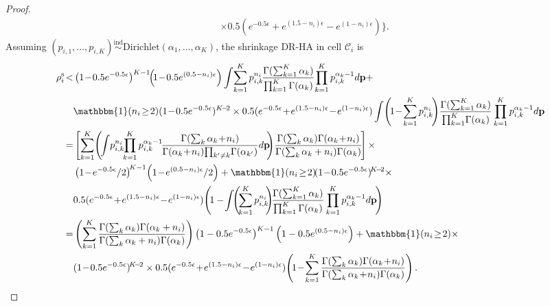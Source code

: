 \documentclass[10pt,journal,compsoc]{IEEEtran}
\newcommand{\C}{\mathcal{C}}
\begin{document}
\begin{proof}
\begin{align*}
&\times0.5(e^{-0.5\epsilon}+e^{(1.5-n_i)\epsilon}-e^{(1-n_i)\epsilon})\bigg\}.
\end{align*}
Assuming $(p_{i,1},\ldots,p_{i,K})\overset{\text{ind}}{\sim}\mbox{Dirichlet}(\alpha_{1},\ldots,\alpha_{K})$, the shrinkage DR-HA in cell $\C_i$ is
\small
\begin{align*}
\rho^{\text{s}}_i\!<&\left(1\!-\!0.5e^{-0.5\epsilon}\right)^{K-1}\!\!\left(\!1\!-\!0.5e^{(0.5-n_i)\epsilon}\right)
\int\!\sum_{k=1}^{K}p_{i,k}^{n_i}\!\frac{\Gamma(\sum_{k=1}^K \alpha_{k})}{\prod_{k=1}^K\Gamma(\alpha_{k})}\!\prod_{k=1}^{K}p_{i,k}^{\alpha_k-1}d\mathbf{p}+\!\\
&\mathbbm{1}(n_i\!\ge\!2)(1\!-\!0.5e^{-0.5\epsilon})^{K\!-\!2}\times0.5(e^{-0.5\epsilon}\!+\!e^{(1.5-n_i)\epsilon}\!-\!e^{(1-n_i)\epsilon})\int\!\left(\!1\!-\!\sum_{k=1}^{K}p_{i,k}^{n_i}\!\right)\!\frac{\Gamma(\sum_{k=1}^K \alpha_{k})}{\prod_{k=1}^K\!\Gamma(\alpha_{k})}\prod_{k=1}^{K}p_{i,k}^{\alpha_k-1}d\mathbf{p}\\
=&\left[
\sum_{k=1}^{K}\!\left(\!\int\!p_{i,k}^{n_i}\!\!\prod_{k=1}^{K}p_{i,k}^{\alpha_k-1}\!\frac{\Gamma(\sum_{k}\alpha_{k}\!+\!n_i)}{\Gamma(\alpha_k\!+\!n_i)\!\prod_{k'\ne k}\! \Gamma(\alpha_{k'})}d\mathbf{p}\!\!\right) \!\frac{\Gamma(\sum_{k}\alpha_{k})\Gamma(\alpha_k\!+\!n_i)}{\Gamma(\sum_{k}\alpha_{k}+n_i)\Gamma(\alpha_k)}\!\right]\times\\
&\left(1\!-\!e^{-0.5\epsilon}/2\right)^{\!K-1}\!\left(1\!-\!e^{(0.5-n_i)\epsilon}/2\right)+\mathbbm{1}(n_i\!\ge\!2)\!(1\!-\!0.5e^{-0.5\epsilon})^{\!K\!-\!2}\times\\
&0.5(e^{-0.5\epsilon}\!+\!e^{(1.5-n_i)\epsilon}\!-\!e^{(1-n_i)\epsilon})\!\left(\!1-\!\int\!\!\left(\!\sum_{k=1}^{K}p_{i,k}^{n_i}\!\!\right)\!\!\frac{\Gamma(\sum_{k=1}^K \alpha_{k})}{\prod_{k=1}^K\Gamma(\alpha_{k})}\prod_{k=1}^{K}p_{i,k}^{\alpha_k-1}d\mathbf{p}\!\right)\\
=&\left(\sum_{k=1}^{K}\frac{\Gamma(\sum_k\alpha_k)\Gamma(\alpha_k+n_i)}{\Gamma(\sum_k\alpha_k+n_i)\Gamma(\alpha_k)}\right)\left(1-0.5e^{-0.5\epsilon}\right)^{K-1}\left(1-0.5e^{(0.5-n_i)\epsilon}\right)+\mathbbm{1}(n_i\!\ge\!2)\times\\
&(1\!-\!0.5e^{-0.5\epsilon})^{\!K\!-\!2}\times0.5(e^{-0.5\epsilon}\!+\!e^{(1.5-n_i)\epsilon}\!-\!e^{(1-n_i)\epsilon})\!\left(\!1\!-\!\sum_{k=1}^{K}\frac{\Gamma(\sum_k\alpha_k)\Gamma(\alpha_k\!+\!n_i)}{\Gamma(\sum_k\alpha_k\!+\!n_i)\Gamma(\alpha_k)}\right).
\end{align*}
\end{proof}


\vspace{-24pt}
\end{document}
